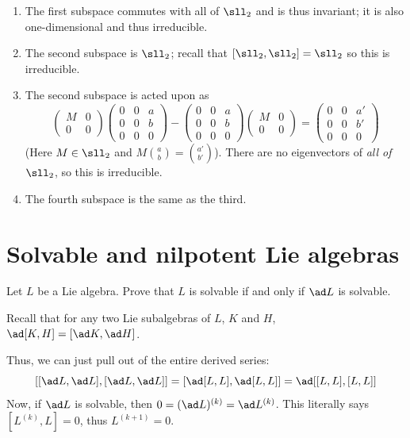 \documentclass[11pt, headheight=30pt]{scrartcl}
\begin{document}
\begin{enumerate}
    \item The first subspace commutes with all of $\sll_2$
    and is thus invariant; it is also one-dimensional and
    thus irreducible.
    \item The second subspace is $\sll_2$;
    recall that $[\sll_2, \sll_2] = \sll_2$
    so this is irreducible.
    \item The second subspace is acted upon as
    \[
        \begin{pmatrix}
        M&0\\0&0
    \end{pmatrix}
        \begin{pmatrix}
        0 & 0 & a\\
        0 & 0 & b\\
        0 & 0 & 0
    \end{pmatrix}
    -\begin{pmatrix}
        0 & 0 & a\\
        0 & 0 & b\\
        0 & 0 & 0
    \end{pmatrix}\begin{pmatrix}
            M&0\\0&0
        \end{pmatrix} =\begin{pmatrix}
        0 & 0 & a'\\
        0 & 0 & b'\\
        0 & 0 & 0
    \end{pmatrix}
    \]
    (Here $M\in \sll_2$ and $M\binom{a}{b} = \binom{a'}{b'}$).
    There are no eigenvectors of \emph{all of} $\sll_2$, so
    this is irreducible.
    \item The fourth subspace is the same as the third.
\end{enumerate}

\section{Solvable and nilpotent Lie algebras}
\begin{prob}
    Let $L$ be a Lie algebra.
    Prove that $L$ is solvable if and only if $\ad L$ is solvable.
\end{prob}

Recall that for any two Lie subalgebras of $L$, $K$ and $H$,
$\ad [K, H] = [\ad K, \ad H]$.

Thus, we can just pull out of the entire derived series:
\[
    [[\ad L, \ad L], [\ad L, \ad L]] = [\ad [L,L], \ad [L,L]] = \ad [[L,L], [L,L]]
\]
Now, if $\ad L$ is solvable, then $0 = (\ad L)^{(k)} = \ad L^{(k)}$.
This literally says $[L^{(k)}, L] = 0$, thus $L^{(k + 1)} = 0$.
\end{document}
